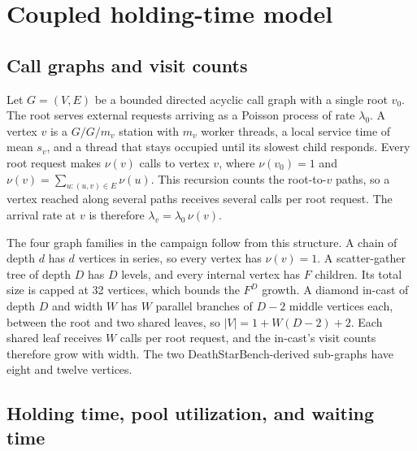 \section{Coupled holding-time model}
\label{sec:model}

\subsection{Call graphs and visit counts}

Let $G=(V,E)$ be a bounded directed acyclic call graph with a single root $v_0$. The root serves external requests arriving as a Poisson process of rate $\lambda_0$. A vertex $v$ is a $G/G/m_v$ station with $m_v$ worker threads, a local service time of mean $s_v$, and a thread that stays occupied until its slowest child responds. Every root request makes $\nu(v)$ calls to vertex $v$, where $\nu(v_0)=1$ and $\nu(v)=\sum_{u:(u,v)\in E}\nu(u)$. This recursion counts the root-to-$v$ paths, so a vertex reached along several paths receives several calls per root request. The arrival rate at $v$ is therefore $\lambda_v=\lambda_0\,\nu(v)$.

The four graph families in the campaign follow from this structure. A chain of depth $d$ has $d$ vertices in series, so every vertex has $\nu(v)=1$. A scatter-gather tree of depth $D$ has $D$ levels, and every internal vertex has $F$ children. Its total size is capped at 32 vertices, which bounds the $F^D$ growth. A diamond in-cast of depth $D$ and width $W$ has $W$ parallel branches of $D-2$ middle vertices each, between the root and two shared leaves, so $\lvert V\rvert=1+W(D-2)+2$. Each shared leaf receives $W$ calls per root request, and the in-cast's visit counts therefore grow with width. The two DeathStarBench-derived sub-graphs have eight and twelve vertices.

\subsection{Holding time, pool utilization, and waiting time}

